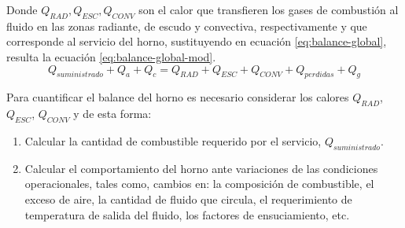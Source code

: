 \par Donde $Q_{RAD}, Q_{ESC}, Q_{CONV}$ son el calor que transfieren los gases de combustión al fluido en las zonas radiante, de escudo y convectiva, respectivamente y que corresponde al servicio del horno, sustituyendo en ecuación \ref{eq:balance-global}, resulta la ecuación \ref{eq:balance-global-mod}.
\begin{equation}
\label{eq:balance-global-mod}
    Q_{suministrado} + Q_{a} + Q_{c} = Q_{RAD} + Q_{ESC} + Q_{CONV} + Q_{perdidas} + Q_{g}
\end{equation}
\par Para cuantificar el balance del horno es necesario considerar los calores $Q_{RAD}$, $Q_{ESC}$, $Q_{CONV}$ y de esta forma:
\begin{enumerate}
    \item Calcular la cantidad de combustible requerido por el servicio, $Q_{suministrado}$.
    \item Calcular el comportamiento del horno ante variaciones de las condiciones operacionales, tales como, cambios en: la composición de combustible, el exceso de aire, la cantidad de fluido que circula, el requerimiento de temperatura de salida del fluido, los factores de ensuciamiento, etc.
\end{enumerate}

